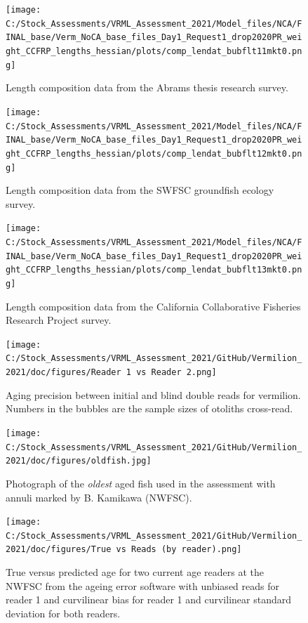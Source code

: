 \documentclass[
  english,
  a4paper,
]{article}
\begin{document}
\begin{figure}
\centering
\texttt{[image: C:/Stock\_Assessments/VRML\_Assessment\_2021/Model\_files/NCA/FINAL\_base/Verm\_NoCA\_base\_files\_Day1\_Request1\_drop2020PR\_weight\_CCFRP\_lengths\_hessian/plots/comp\_lendat\_bubflt11mkt0.png]}
\caption{Length composition data from the Abrams thesis research survey.\label{fig:len-data-ABRAMS-RESEARCH}}
\end{figure}

\begin{figure}
\centering
\texttt{[image: C:/Stock\_Assessments/VRML\_Assessment\_2021/Model\_files/NCA/FINAL\_base/Verm\_NoCA\_base\_files\_Day1\_Request1\_drop2020PR\_weight\_CCFRP\_lengths\_hessian/plots/comp\_lendat\_bubflt12mkt0.png]}
\caption{Length composition data from the SWFSC groundfish ecology survey.\label{fig:len-data-SWFSC-GF-ECOL}}
\end{figure}

\begin{figure}
\centering
\texttt{[image: C:/Stock\_Assessments/VRML\_Assessment\_2021/Model\_files/NCA/FINAL\_base/Verm\_NoCA\_base\_files\_Day1\_Request1\_drop2020PR\_weight\_CCFRP\_lengths\_hessian/plots/comp\_lendat\_bubflt13mkt0.png]}
\caption{Length composition data from the California Collaborative Fisheries Research Project survey.\label{fig:len-data-CCFRP}}
\end{figure}

\begin{figure}
\centering
\texttt{[image: C:/Stock\_Assessments/VRML\_Assessment\_2021/GitHub/Vermilion\_2021/doc/figures/Reader 1 vs Reader 2.png]}
\caption{Aging precision between initial and blind double reads for vermilion.
Numbers in the bubbles are the sample sizes of otoliths cross-read.\label{fig:reader1reader2}}
\end{figure}

\begin{figure}
\centering
\texttt{[image: C:/Stock\_Assessments/VRML\_Assessment\_2021/GitHub/Vermilion\_2021/doc/figures/oldfish.jpg]}
\caption{Photograph of the \emph{oldest} aged fish used in the assessment with annuli marked by B. Kamikawa (NWFSC).\label{fig:oldfish}}
\end{figure}

\begin{figure}
\centering
\texttt{[image: C:/Stock\_Assessments/VRML\_Assessment\_2021/GitHub/Vermilion\_2021/doc/figures/True vs Reads (by reader).png]}
\caption{True versus predicted age for two current age readers at the NWFSC
from the ageing error software with unbiased reads for reader 1 and curvilinear
bias for reader 1 and curvilinear standard deviation for both readers.\label{fig:truereads}}
\end{figure}
\end{document}
